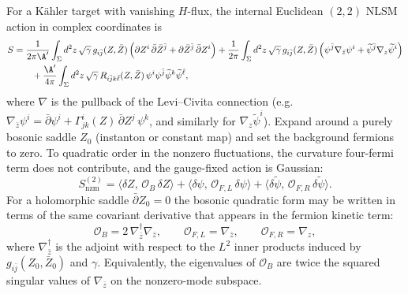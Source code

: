 \documentclass[12pt]{article}
\newcommand{\wt}{\widetilde}
\begin{document}
For a K\"ahler target with vanishing $H$-flux, the internal Euclidean $(2,2)$
NLSM action in complex coordinates is \cite[Ch.~9, Eq.~(9.12)]{Yin:FoundationsStringTheory}
\begin{equation}
  \begin{aligned}
    S
    &=
    \frac{1}{2\pi \A'}\int_\Sigma d^2z\,\sqrt{\gamma}\,
    g_{i\bar j}(Z,\bar Z)\,
    \Bigl(\partial Z^i\,\bar\partial \bar Z^{\bar j}+\partial \bar Z^{\bar j}\,\bar\partial Z^i\Bigr)
    +\frac{1}{2\pi}\int_\Sigma d^2z\,\sqrt{\gamma}\,
    g_{i\bar j}(Z,\bar Z)\,\Bigl(\psi^{\bar j}\nabla_{\bar z}\psi^i+\wt\psi^{\bar j}\nabla_{z}\wt\psi^i\Bigr)\\
    &\qquad
    +\frac{\A'}{4\pi}\int_\Sigma d^2z\,\sqrt{\gamma}\,
    R_{i\bar jk\bar\ell}(Z,\bar Z)\,\psi^i\psi^{\bar j}\wt\psi^k\wt\psi^{\bar\ell},
  \end{aligned}
  \label{eq:uv-nlsm-action-complex}
\end{equation}
where $\nabla$ is the pullback of the Levi--Civita connection (e.g.
$\nabla_{\bar z}\psi^i=\bar\partial\psi^i+\Gamma^i_{jk}(Z)\,\bar\partial Z^j\,\psi^k$,
and similarly for $\nabla_z\wt\psi^i$). Expand around a purely bosonic saddle
$Z_0$ (instanton or constant map) and set the background fermions to zero. To
quadratic order in the nonzero fluctuations, the curvature four-fermi term does
not contribute, and the gauge-fixed action is Gaussian:
\begin{equation}
  S^{(2)}_{\mathrm{nzm}}
  =
  \langle \delta Z,\,\mathcal{O}_{B}\,\delta Z\rangle
  + \langle \delta\psi,\,\mathcal{O}_{F,L}\,\delta\psi\rangle
  + \langle \delta\wt\psi,\,\mathcal{O}_{F,R}\,\delta\wt\psi\rangle.
  \label{eq:uv-nzm-quadratic}
\end{equation}
For a holomorphic saddle $\bar\partial Z_0=0$ the bosonic quadratic form may be
written in terms of the same covariant derivative that appears in the fermion
kinetic term:
\begin{equation}
  \mathcal{O}_{B}=2\,\nabla_{\bar z}^\dagger\nabla_{\bar z},
  \qquad
  \mathcal{O}_{F,L}=\nabla_{\bar z},
  \qquad
  \mathcal{O}_{F,R}=\nabla_{z},
  \label{eq:uv-nzm-operators}
\end{equation}
where $\nabla_{\bar z}^\dagger$ is the adjoint with respect to the $L^2$ inner
products induced by $g_{i\bar j}(Z_0,\bar Z_0)$ and $\gamma$.
Equivalently, the eigenvalues of $\mathcal{O}_B$ are twice the squared singular
values of $\nabla_{\bar z}$ on the nonzero-mode subspace.
\end{document}
